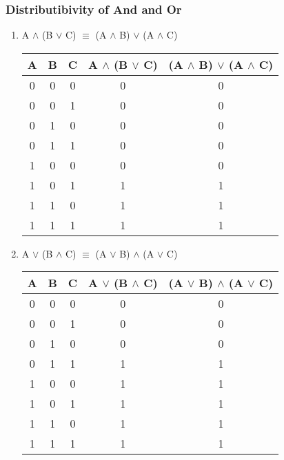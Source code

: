 \documentclass[11pt]{article}
\begin{document}
\subsubsection{Distributibivity of And and Or}
\begin{enumerate}

  \item A $\land$ (B $\lor$ C) $\equiv$ (A $\land$ B) $\lor$ (A $\land$ C)

\begin{center}
  \begin{tabular}{| c | c | c | c | c |}
    \hline
    A & B & C & A $\land$ (B $\lor$ C) & (A $\land$ B) $\lor$ (A $\land$ C) \\ \hline
    0 & 0 & 0 & 0 & 0 \\
    0 & 0 & 1 & 0 & 0 \\
    0 & 1 & 0 & 0 & 0 \\
    0 & 1 & 1 & 0 & 0 \\
    1 & 0 & 0 & 0 & 0 \\
    1 & 0 & 1 & 1 & 1 \\
    1 & 1 & 0 & 1 & 1 \\
    1 & 1 & 1 & 1 & 1 \\ \hline
  \end{tabular}
\end{center}

  \item A $\lor$ (B $\land$ C) $\equiv$ (A $\lor$ B) $\land$ (A $\lor$ C)

\begin{center}
  \begin{tabular}{| c | c | c | c | c |}
    \hline
    A & B & C & A $\lor$ (B $\land$ C) & (A $\lor$ B) $\land$ (A $\lor$ C) \\ \hline
    0 & 0 & 0 & 0 & 0 \\
    0 & 0 & 1 & 0 & 0 \\
    0 & 1 & 0 & 0 & 0 \\
    0 & 1 & 1 & 1 & 1 \\
    1 & 0 & 0 & 1 & 1 \\
    1 & 0 & 1 & 1 & 1 \\
    1 & 1 & 0 & 1 & 1 \\
    1 & 1 & 1 & 1 & 1 \\ \hline
  \end{tabular}
\end{center}
\end{enumerate}

\newpage
\end{document}
